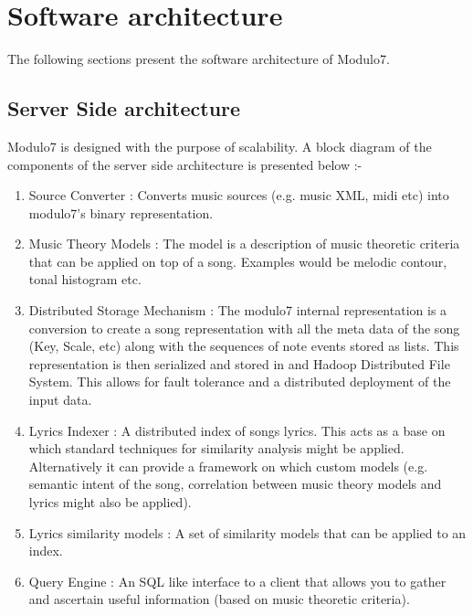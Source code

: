 \chapter{Software architecture}
The following sections present the software architecture of Modulo7.
\section{Server Side architecture}
\noindent Modulo7 is designed with the purpose of scalability. A block diagram of the components of the server side architecture is presented below :-
\begin{enumerate}
\item Source Converter : Converts music sources (e.g. music XML, midi etc) into modulo7's binary representation.
\item Music Theory Models : The model is a description of music theoretic criteria that can be applied on top of a song. Examples would be melodic contour, tonal histogram etc. 
\item Distributed Storage Mechanism : The modulo7 internal representation is a conversion to create a song representation with all the meta data of the song (Key, Scale,  etc) along with the sequences of note events stored as lists. This representation is then serialized and stored in and Hadoop Distributed File System. This allows for fault tolerance and a distributed deployment of the input data.
\item Lyrics Indexer : A distributed index of songs lyrics. This acts as a base on which standard techniques for similarity analysis might be applied. Alternatively it can provide a framework on which custom models (e.g. semantic intent of the song, correlation between music theory models and lyrics might also be applied).  
\item Lyrics similarity models : A set of similarity models that can be applied to an index. 
\item Query Engine : An SQL like interface to a client that allows you to gather and ascertain useful information (based on music theoretic criteria). 
\end{enumerate}

